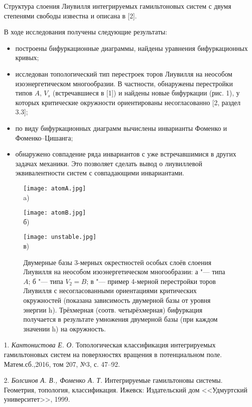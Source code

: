 Структура слоения Лиувилля интегрируемых гамильтоновых систем с двумя степенями свободы известна и описана в [2].

В ходе исследования получены следующие результаты:
\begin{itemize}
	\item построены бифуркационные диаграммы, найдены уравнения бифуркационных кривых;
	\item исследован топологический тип перестроек торов Лиувилля на неособом изоэнергетическом многообразии. В частности, обнаружены перестройки типов $A$, $V_s$ (встречавшиеся в [1]) и найдены новые бифуркации (рис. 1), у которых критические окружности ориентированы несогласованно [2, раздел 3.3];
	\item по виду бифуркационных диаграмм вычислены инварианты Фоменко и Фоменко--Цишанга;
	\item обнаружено совпадение ряда инвариантов с уже встречавшимися в других задачах механики. Это позволяет сделать вывод о лиувиллевой эквивалентности систем с совпадающими инвариантами.
\end{itemize}
\begin{figure}
\begin{minipage}{0.33\linewidth}
\begin{center}
\texttt{[image: atomA.jpg]} \\ a)
\end{center}
\end{minipage}
\hfill
\begin{minipage}{0.33\linewidth}
\begin{center}
\texttt{[image: atomB.jpg]} \\ б)
\end{center}
\end{minipage}
\hfill
\begin{minipage}{0.98\linewidth}
\begin{center}
\texttt{[image: unstable.jpg]} \\ в)
\end{center}
\end{minipage}
\caption{\small{Двумерные базы 3-мерных окрестностей особых слоёв слоения Лиувилля на неособом изоэнергетическом многообразии: а "--- типа $A$; б "--- типа $V_2=B$; в "--- пример 4-мерной перестройки торов Лиувилля с несогласованными ориентациями критических окружностей (показана зависимость двумерной базы от уровня энергии h). Трёхмерная (соотв. четырёхмерная) бифуркация получается в результате умножения двумерной базы (при каждом значении h) на окружность.}}
\end{figure}

\litlist

1. {\it Кантонистова Е. О.} Топологическая классификация интегрируемых гамильтоновых систем на поверхностях вращения в потенциальном поле.
Матем.сб.,2016, том 207, №3, с. 47--92.

2. {\it Болсинов А. В., Фоменко А. Т.} Интегрируемые гамильтоновы системы. Геометрия, топология, классификация. Ижевск: Издательский дом <<Удмуртский университет>>, 1999.

